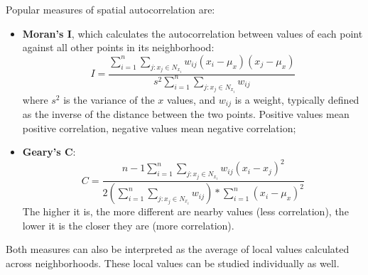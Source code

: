 Popular measures of spatial autocorrelation are:    
\begin{itemize}
    \item \textbf{Moran's I}, which calculates the autocorrelation between values of each point against all other points in its neighborhood:
    \begin{equation*}
        I = \frac{\sum_{i=1}^n \sum_{j: x_j \in N_{x_i}} w_{ij} (x_i - \mu_x)(x_j - \mu_x)}{s^2 \sum_{i=1}^n \sum_{j: x_j \in N_{x_i}} w_{ij}} 
    \end{equation*}
    where $s^2$ is the variance of the $x$ values, and $w_{ij}$ is a weight, typically defined as the inverse of the distance between the two points. Positive values mean positive correlation, negative values mean negative correlation;
    \item \textbf{Geary's C}:
    \begin{equation*}
        C = \frac{n-1 \sum_{i=1}^n \sum_{j: x_j \in N_{x_i}} w_{ij} (x_i - x_j)^2}{2 (\sum_{i=1}^n \sum_{j: x_j \in N_{x_i}} w_{ij}) * \sum_{i=1}^n (x_i - \mu_x)^2}
    \end{equation*}
    The higher it is, the more different are nearby values (less correlation), the lower it is the closer they are (more correlation).
\end{itemize}
Both measures can also be interpreted as the average of local values calculated across neighborhoods. These local values can be studied individually as well.